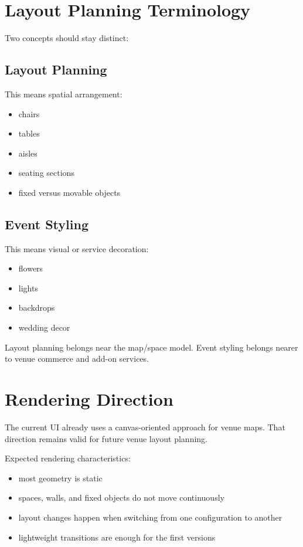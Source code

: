 \documentclass[11pt,a4paper]{article}
\begin{document}
\section{Layout Planning Terminology}

Two concepts should stay distinct:

\subsection{Layout Planning}

This means spatial arrangement:
\begin{itemize}
    \item chairs
    \item tables
    \item aisles
    \item seating sections
    \item fixed versus movable objects
\end{itemize}

\subsection{Event Styling}

This means visual or service decoration:
\begin{itemize}
    \item flowers
    \item lights
    \item backdrops
    \item wedding decor
\end{itemize}

Layout planning belongs near the map/space model. Event styling belongs nearer to venue commerce and add-on services.

\section{Rendering Direction}

The current UI already uses a canvas-oriented approach for venue maps. That direction remains valid for future venue layout planning.

Expected rendering characteristics:
\begin{itemize}
    \item most geometry is static
    \item spaces, walls, and fixed objects do not move continuously
    \item layout changes happen when switching from one configuration to another
    \item lightweight transitions are enough for the first versions
\end{itemize}
\end{document}
